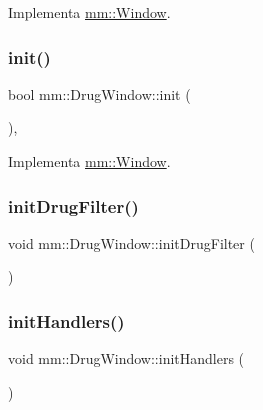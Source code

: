 Implementa \mbox{\hyperlink{classmm_1_1_window_a0cd7b4b0feb9505c44503547a161fcd8}{mm\+::\+Window}}.

\mbox{\label{classmm_1_1_drug_window_a54f331f1c516ce9113a9dade43948a16}} 
\subsubsection{\texorpdfstring{init()}{init()}}
{\footnotesize\ttfamily bool mm\+::\+Drug\+Window\+::init (\begin{DoxyParamCaption}{ }\end{DoxyParamCaption})\hspace{0.3cm}{\ttfamily [override]}, {\ttfamily [virtual]}}



Implementa \mbox{\hyperlink{classmm_1_1_window_aba03fbf4761b2f106352baecf5996e10}{mm\+::\+Window}}.

\mbox{\label{classmm_1_1_drug_window_a2d01e24deaba42b7c24cf5b5457f4298}} 
\subsubsection{\texorpdfstring{init\+Drug\+Filter()}{initDrugFilter()}}
{\footnotesize\ttfamily void mm\+::\+Drug\+Window\+::init\+Drug\+Filter (\begin{DoxyParamCaption}{ }\end{DoxyParamCaption})}

\mbox{\label{classmm_1_1_drug_window_a4926180df1b7f3dfc1f2b1746522c6fb}} 
\subsubsection{\texorpdfstring{init\+Handlers()}{initHandlers()}}
{\footnotesize\ttfamily void mm\+::\+Drug\+Window\+::init\+Handlers (\begin{DoxyParamCaption}{ }\end{DoxyParamCaption})}

